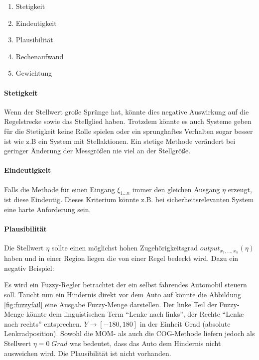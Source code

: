 \documentclass[12pt,a4paper,bibliography=totocnumbered,listof=totocnumbered, abstracton]{scrartcl}
\theoremstyle{Umgebung}
\begin{document}
\begin{enumerate} 
	\item Stetigkeit
	\item Eindeutigkeit
	\item Plausibilität
	\item Rechenaufwand
	\item Gewichtung
\end{enumerate}

\paragraph{Stetigkeit}

Wenn der Stellwert große Sprünge hat, könnte dies negative Auswirkung auf die Regelstrecke sowie das Stellglied haben. Trotzdem könnte es auch Systeme geben für die Stetigkeit keine Rolle spielen oder ein sprunghaftes Verhalten sogar besser ist wie z.B ein System mit Stellaktionen. Ein stetige Methode verändert bei geringer Änderung der Messgrößen nie viel an der Stellgröße.

\paragraph{Eindeutigkeit}

Falls die Methode für einen Eingang $\xi_{1...n}$ immer den gleichen Ausgang $\eta$ erzeugt, ist diese Eindeutig. Dieses Kriterium könnte z.B. bei sicherheitsrelevanten System eine harte Anforderung sein.

\paragraph{Plausibilität}

Die Stellwert $\eta$ sollte einen möglichst hohen Zugehörigkeitsgrad $output_{x_1,..., x_n}(\eta)$ haben und in einer Region liegen die von einer Regel bedeckt wird. Dazu ein negativ Beispiel:

\begin{bsp}
	\label{bsp:fuzzy}
	Es wird ein Fuzzy-Regler betrachtet der ein selbst fahrendes Automobil steuern soll. Taucht nun ein Hindernis direkt vor dem Auto auf könnte die Abbildung \ref{fig:fuzzyfail} eine Ausgabe Fuzzy-Menge darstellen. Der linke Teil der Fuzzy-Menge könnte dem linguistischen Term \enquote{Lenke nach links}, der Rechte \enquote{Lenke nach rechts} entsprechen.  $Y \rightarrow \left[-180,180\right]$ in der Einheit Grad (absolute Lenkradposition). Sowohl die MOM- als auch die COG-Methode liefern jedoch als Stellwert $\eta = 0 \; Grad$ was bedeutet, dass das Auto dem Hindernis nicht ausweichen wird. Die Plausibilität ist nicht vorhanden.
\end{bsp}
\end{document}
